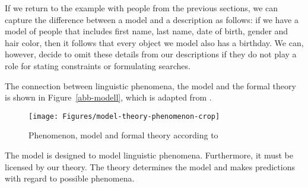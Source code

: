 If we return to the example with people from the previous sections, we can capture the difference between a model and a description as follows:
if we have a model of people that includes first name, last name, date of birth, gender and hair color, then it follows that every object we model also has a birthday.
We can, however, decide to omit these details from our descriptions if they do not play a role for
stating constraints or formulating searches.

The connection between linguistic phenomena, the model and the formal theory is shown in
Figure~\vref{abb-modell}, which is adapted from .
\begin{figure}
\centerline{%
\texttt{[image: Figures/model-theory-phenomenon-crop]}
}
\caption{\label{abb-modell}Phenomenon, model and formal theory according to \citet[]{Netter98a}}
\end{figure}%
\nocite{Netter98a}%
%
%
%
The model is designed to model linguistic phenomena. Furthermore, it must be licensed by our theory.
The theory determines the model and makes predictions with regard to possible phenomena.

